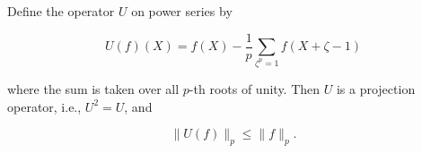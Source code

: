 Define the operator $U$ on power series by

$$U(f)(X) = f(X) - \frac{1}{p} \sum_{\zeta^p = 1} f(X + \zeta - 1)$$

where the sum is taken over all $p$-th roots of unity. Then $U$ is a projection operator, i.e., $U^2 = U$, and

$$\|U(f)\|_p \le \|f\|_p.$$
